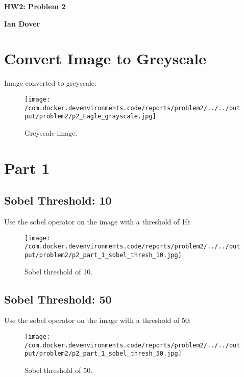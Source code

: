 \documentclass{article}%
\begin{document}
%
\normalsize%
\pagestyle{header}%
\begin{minipage}{\textwidth}%
\centering%
\begin{Large}%
\textbf{HW2: Problem 2}%
\end{Large}%
\linebreak%
\begin{large}%
\textbf{Ian Dover}%
\end{large}%
\end{minipage}%
\section{Convert Image to Greyscale}%
\label{sec:ConvertImagetoGreyscale}%
Image converted to greyscale:%


\begin{figure}[h!]%
\centering%
\texttt{[image: /com.docker.devenvironments.code/reports/problem2/../../output/problem2/p2\_Eagle\_grayscale.jpg]}%
\caption{Greyscale image.}%
\end{figure}

%
\section{Part 1}%
\label{sec:Part1}%
\subsection{Sobel Threshold: 10}%
\label{subsec:SobelThreshold10}%
Use the sobel operator on the image with a threshold of 10:%


\begin{figure}[h!]%
\centering%
\texttt{[image: /com.docker.devenvironments.code/reports/problem2/../../output/problem2/p2\_part\_1\_sobel\_thresh\_10.jpg]}%
\caption{Sobel threshold of 10.}%
\end{figure}

%
\subsection{Sobel Threshold: 50}%
\label{subsec:SobelThreshold50}%
Use the sobel operator on the image with a threshold of 50:%


\begin{figure}[h!]%
\centering%
\texttt{[image: /com.docker.devenvironments.code/reports/problem2/../../output/problem2/p2\_part\_1\_sobel\_thresh\_50.jpg]}%
\caption{Sobel threshold of 50.}%
\end{figure}
\end{document}
